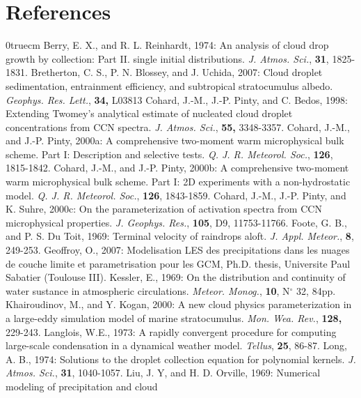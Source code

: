 \section{References}
\parindent 0truecm
\por
Berry, E. X., and R. L. Reinhardt, 1974: An analysis of cloud drop growth by
        collection: Part II. single initial distributions.
        {\it J. Atmos. Sci.},
        {\bf 31},
        1825-1831.
\por
Bretherton, C. S., P. N. Blossey, and J. Uchida, 2007: Cloud droplet sedimentation, entrainment efficiency,
           and subtropical stratocumulus albedo.
           {\it Geophys. Res. Lett.},
           {\bf 34,} 
           L03813
\por
Cohard, J.-M., J.-P. Pinty, and C. Bedos, 1998: Extending Twomey's analytical
        estimate of nucleated cloud droplet concentrations from CCN spectra.
        {\it J. Atmos. Sci.},
        {\bf 55,}
        3348-3357.
\por
Cohard, J.-M., and J.-P. Pinty, 2000a: A comprehensive two-moment warm
        microphysical bulk scheme. Part I: Description and selective tests.
        {\it Q. J. R. Meteorol. Soc.},
        {\bf 126},
        1815-1842.
\por
Cohard, J.-M., and J.-P. Pinty, 2000b: A comprehensive two-moment warm
        microphysical bulk scheme. Part I: 2D experiments with a
        non-hydrostatic model.
        {\it Q. J. R. Meteorol. Soc.},
        {\bf 126},
        1843-1859.
\por
Cohard, J.-M., J.-P. Pinty, and K. Suhre, 2000c: On the parameterization of
        activation spectra from CCN microphysical properties.
        {\it J. Geophys.  Res.},
        {\bf 105},
        D9,
        11753-11766.
\por
Foote, G. B., and P. S. Du Toit, 1969: Terminal velocity of raindrops aloft.
{\it J. Appl. Meteor.}, {\bf 8}, 249-253.
\por
Geoffroy, O., 2007: Modelisation LES des precipitations dans les nuages de couche limite et parametrisation pour les GCM, Ph.D. thesis, Universite Paul Sabatier (Toulouse III).
\por
Kessler, E., 1969: On the distribution and continuity of water sustance in
atmospheric circulations. {\it Meteor. Monog.}, {\bf 10}, N$^\circ$ 32, 84pp.
\por
Khairoudinov, M., and Y. Kogan, 2000: A new cloud physics parameterization
        in a large-eddy simulation model of marine stratocumulus.
        {\it Mon. Wea. Rev.},
        {\bf 128,}
        229-243.
\por
Langlois, W.E., 1973: A rapidly convergent procedure for computing large-scale
condensation in a dynamical weather model. {\it Tellus}, {\bf 25}, 86-87.
\por
Long, A. B., 1974: Solutions to the droplet collection equation for polynomial
        kernels.
        {\it J. Atmos. Sci.},
        {\bf 31},
        1040-1057.
\por
Liu, J. Y, and H. D. Orville, 1969: Numerical modeling of precipitation and cloud
